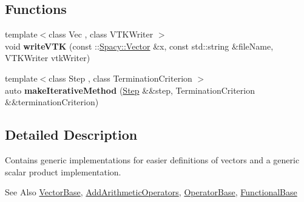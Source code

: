 \subsection*{Functions}
\begin{DoxyCompactItemize}
\item 
\hypertarget{namespaceSpacy_1_1Generic_a2507c0093c30bbad744a860e4cbe54d4}{{\footnotesize template$<$class Vec , class V\-T\-K\-Writer $>$ }\\void {\bfseries write\-V\-T\-K} (const \-::\hyperlink{classSpacy_1_1Vector}{Spacy\-::\-Vector} \&x, const std\-::string \&file\-Name, V\-T\-K\-Writer vtk\-Writer)}\label{namespaceSpacy_1_1Generic_a2507c0093c30bbad744a860e4cbe54d4}

\item 
\hypertarget{namespaceSpacy_1_1Generic_a3088c967001284a5f281082fa19168b0}{{\footnotesize template$<$class Step , class Termination\-Criterion $>$ }\\auto {\bfseries make\-Iterative\-Method} (\hyperlink{classSpacy_1_1Generic_1_1Step}{Step} \&\&step, Termination\-Criterion \&\&termination\-Criterion)}\label{namespaceSpacy_1_1Generic_a3088c967001284a5f281082fa19168b0}

\end{DoxyCompactItemize}


\subsection{Detailed Description}
Contains generic implementations for easier definitions of vectors and a generic scalar product implementation. \begin{DoxySeeAlso}{See Also}
\hyperlink{classSpacy_1_1VectorBase}{Vector\-Base}, \hyperlink{classSpacy_1_1AddArithmeticOperators}{Add\-Arithmetic\-Operators}, \hyperlink{classSpacy_1_1OperatorBase}{Operator\-Base}, \hyperlink{classSpacy_1_1FunctionalBase}{Functional\-Base} 
\end{DoxySeeAlso}
